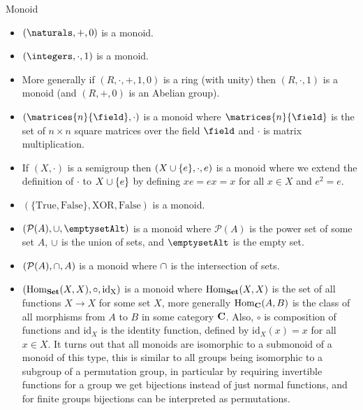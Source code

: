 \begin{exm}{Monoid}{}
    \begin{itemize}
        \item \((\naturals, +, 0)\) is a monoid.
        
        \item \((\integers, \cdot, 1)\) is a monoid.
        
        \item More generally if \((R, \cdot, +, 1, 0)\) is a ring (with unity) then \((R, \cdot, 1)\) is a monoid (and \((R, +, 0)\) is an Abelian group).
        
        \item \((\matrices{n}{\field}, \cdot)\) is a monoid where \(\matrices{n}{\field}\) is the set of \(n\times n\) square matrices over the field \(\field\) and \(\cdot\) is matrix multiplication.
        
        \item If \((X, \cdot)\) is a semigroup then \((X \cup \{e\}, \cdot, e)\) is a monoid where we extend the definition of \(\cdot\) to \(X \cup \{e\}\) by defining \(xe = ex = x\) for all \(x \in X\) and \(e^2 = e\).
        
        \item \((\{\mathrm{True}, \mathrm{False}\}, \mathrm{XOR}, \mathrm{False})\)  is a monoid.
        
        \item \((\mathcal{P}(A), \union, \emptysetAlt)\) is a monoid where \(\mathcal{P}(A)\) is the power set of some set \(A\),  \(\cup\) is the union of sets, and \(\emptysetAlt\) is the empty set.
        
        \item \((\mathcal{P}(A), \cap, A)\) is a monoid where \(\cap\) is the intersection of sets.
        
        \item \((\operatorname{Hom}_{\mathbf{Set}}(X, X), \circ, \mathrm{id_X})\) is a monoid where \(\operatorname{Hom}_{\mathbf{Set}}(X, X)\) is the set of all functions \(X \to X\) for some set \(X\), more generally \(\operatorname{Hom}_{\mathbf{C}}(A, B)\) is the class of all morphisms from \(A\) to \(B\) in some category \(\mathbf{C}\).
        Also, \(\circ\) is composition of functions and \(\mathrm{id}_{X}\) is the identity function, defined by \(\mathrm{id}_X(x) = x\) for all \(x \in X\).
        It turns out that all monoids are isomorphic to a submonoid of a monoid of this type, this is similar to all groups being isomorphic to a subgroup of a permutation group, in particular by requiring invertible functions for a group we get bijections instead of just normal functions, and for finite groups bijections can be interpreted as permutations.
        

\end{itemize}
\end{exm}
